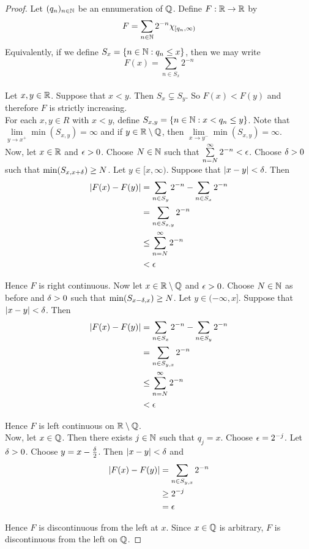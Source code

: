 \documentclass{book}
\begin{document}
	\begin{proof}
		Let $(q_n)_{n\in \mathbb{N}}$ be an ennumeration of $\mathbb{Q}$. Define $F:\mathbb{R} \rightarrow \mathbb{R}$ by $$F =\sum\limits_{n\in \mathbb{N}} 2^{-n}\chi_{[q_n, \infty)}$$ 
		Equivalently, if we define $S_x=\{n \in \mathbb{N}: q_n \leq x\}$, then we may write $$F(x) = \sum\limits_{n \in S_x}2^{-n}$$\\ Let $x, y \in \mathbb{R}$. Suppose that $x < y$. Then $S_x \subsetneq S_y$. So $F(x)<F(y)$ and therefore $F$ is strictly increasing.\\ 
		For each $x,y \in R$ with $x<y$, define $S_{x,y}= \{n \in \mathbb{N}:x< q_n \leq y\}$. Note that $\lim\limits_{y\rightarrow x^+}\min(S_{x,y}) = \infty$ and if $y \in \mathbb{R} \setminus \mathbb{Q}$, then $\lim\limits_{x\rightarrow y^-}\min(S_{x,y}) = \infty$.\\
		Now, let $x \in \mathbb{R}$ and $\epsilon>0$. Choose $N \in \mathbb{N}$ such that $\sum\limits_{n = N}^{\infty}2^{-n}<\epsilon$. Choose $\delta>0$ such that $\min (S_{x,x+\delta}) \geq N$.  Let $y \in [x,\infty)$. Suppose that $|x-y| < \delta$. Then 
		\begin{align*}
			|F(x)-F(y)| 
			&= \sum\limits_{n \in S_y}2^{-n} - \sum\limits_{n \in S_x}2^{-n}\\
			& = \sum\limits_{n \in S_{x,y}}2^{-n}\\
			& \leq \sum\limits_{n=N}^{\infty}2^{-n}\\
			&<\epsilon
		\end{align*} 
		
		Hence $F$ is right continuous. Now let $x \in \mathbb{R}\setminus \mathbb{Q}$ and $\epsilon>0$. Choose $N \in \mathbb{N}$ as before and $\delta>0$ such that $\min(S_{x-\delta,x})\geq N$. Let $y \in (-\infty, x]$. Suppose that $|x-y|<\delta$. Then 
		\begin{align*}
			|F(x)-F(y)| 
			&= \sum\limits_{n \in S_x}2^{-n} - \sum\limits_{n \in S_y}2^{-n}\\
			& = \sum\limits_{n \in S_{y,x}}2^{-n}\\
			& \leq \sum\limits_{n=N}^{\infty}2^{-n}\\
			&<\epsilon
		\end{align*}
		
		Hence $F$ is left continuous on $\mathbb{R}\setminus \mathbb{Q}$.\\
		Now, let $x \in \mathbb{Q}$. Then there exists $j \in \mathbb{N}$ such that $q_j=x$. Choose $\epsilon=2^{-j}$. Let $\delta>0$. Choose $y=x-\frac{\delta}{2}$. Then $|x-y|< \delta$ and 
		\begin{align*}
			|F(x)-F(y)|
			&= \sum\limits_{n \in S_{y,x}}2^{-n}\\
			&\geq 2^{-j}\\
			&= \epsilon
		\end{align*}
		
		Hence $F$ is discontinuous from the left at $x$. Since $x \in \mathbb{Q}$ is arbitrary, $F$ is discontinuous from the left on $\mathbb{Q}$.  
	\end{proof}
	
\end{document}
